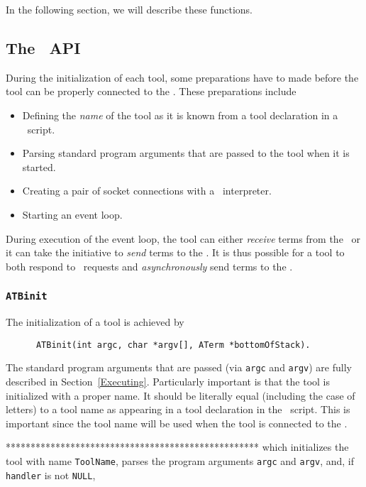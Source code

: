 \documentclass[a4,twoside,noweb]{article} %
\begin{document}
In the following section, we will describe these functions.


\subsection{\label{ToolBusAPI}The \TB\ API}

During the initialization of each tool, some preparations have to made
before the tool can be properly connected to the \TB. These preparations
include
\begin{itemize}
\item Defining the {\em name} of the tool as it is known from a tool declaration
in a \T\ script.
\item Parsing standard program arguments that are passed to the tool
when it is started.
\item Creating a pair of socket connections with a \TB\ interpreter.
\item Starting an event loop.
\end{itemize}

During execution of the event loop, the tool can either \emph{receive} terms from
the \TB\ or it can take the initiative to \emph{send} terms to the \TB.
It is thus possible for a tool to both respond to \TB\ requests
and \emph{asynchronously} send terms to the \TB.

\subsubsection{\label{ATBinit}{\tt ATBinit}}

The initialization of a tool is achieved by
\begin{verbatim}
      ATBinit(int argc, char *argv[], ATerm *bottomOfStack).
\end{verbatim}

The standard program arguments that are passed (via {\tt argc} and {\tt argv})
are fully described in Section~\ref{Executing}. Particularly important is that
the tool is initialized with a proper name.  It should be literally equal
(including the case of letters) to a tool name as appearing in a tool
declaration in the \T\ script. This is important since the tool name will be
used when the tool is connected to the \TB.


***************************************************
which initializes the tool with name {\tt ToolName},
parses the program arguments {\tt argc} and {\tt argv},
and, if {\tt handler} is not {\tt NULL},
\end{document}
